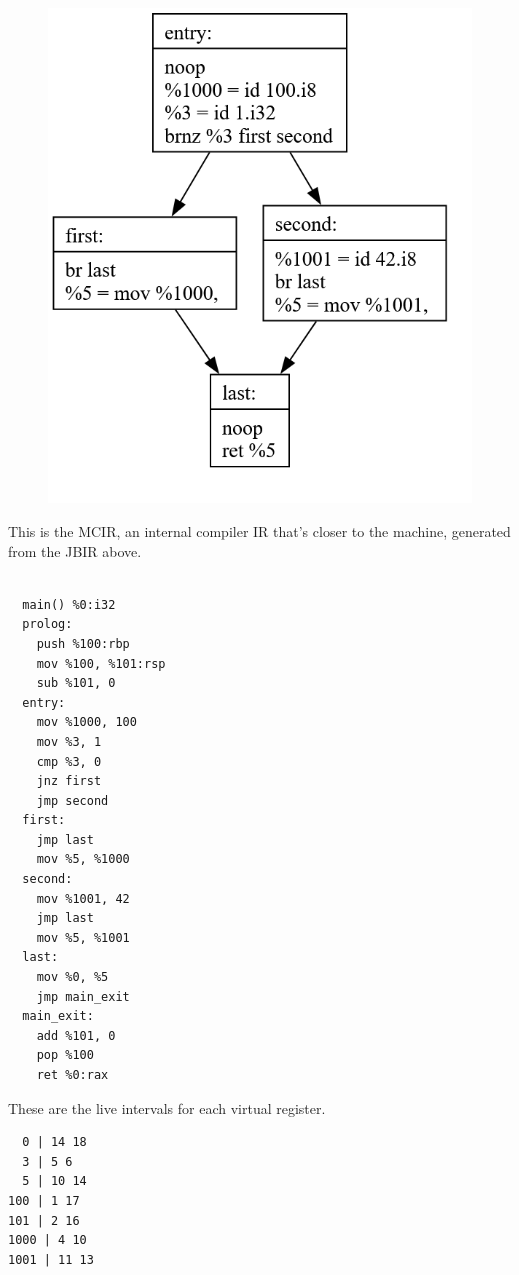 \documentclass[11pt, a4paper, titlepage]{article}
\begin{document}
\begin{figure}[H]
  \centering
  \includegraphics[scale=0.3]{images/i6.png}
\end{figure}

This is the MCIR, an internal compiler IR that's closer to the machine,
generated from the JBIR above.

\begin{lstlisting}

  main() %0:i32
  prolog:
    push %100:rbp
    mov %100, %101:rsp
    sub %101, 0
  entry:
    mov %1000, 100
    mov %3, 1
    cmp %3, 0
    jnz first
    jmp second
  first:
    jmp last
    mov %5, %1000
  second:
    mov %1001, 42
    jmp last
    mov %5, %1001
  last:
    mov %0, %5
    jmp main_exit
  main_exit:
    add %101, 0
    pop %100
    ret %0:rax
\end{lstlisting}

These are the live intervals for each virtual register.

\begin{lstlisting}
  0 | 14 18
  3 | 5 6
  5 | 10 14
100 | 1 17
101 | 2 16
1000 | 4 10
1001 | 11 13
\end{lstlisting}
\end{document}
